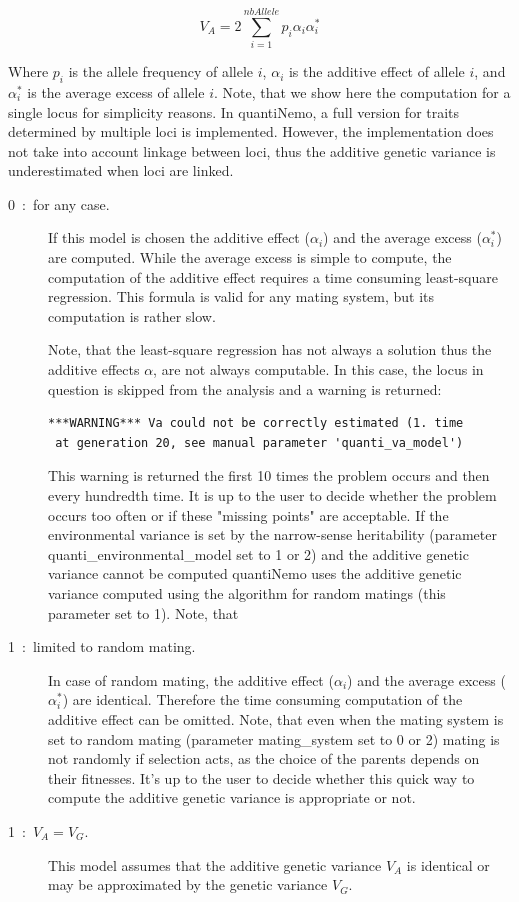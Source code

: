 \documentclass[letterpaper,12pt,oneside]{book}
\begin{document}
\begin{description}
\[ V_{A} = 2\sum_{i=1}^{nbAllele}p_{i}\alpha_{i}\alpha_{i}^{*} \]

Where $p_{i}$ is the allele frequency of allele $i$, $\alpha_{i}$ is the additive effect of allele $i$, and $\alpha_{i}^{*}$ is the average excess of allele $i$. Note, that we show here the computation for a single locus for simplicity reasons. In quantiNemo, a full version for traits determined by multiple loci is implemented. However, the implementation does not take into account linkage between loci, thus the additive genetic variance is underestimated when loci are linked.

\begin{description}
\item [0~:~for any case.] If this model is chosen the additive effect ($\alpha_{i}$) and the average excess ($\alpha_{i}^{*}$) are computed. While the average excess is simple to compute, the computation of the additive effect requires a time consuming least-square regression. This formula is valid for any mating system, but its computation is rather slow. 

Note, that the least-square regression has not always a solution thus the additive effects $\alpha$, are not always computable. In this case, the locus in question is skipped from the analysis and a warning is returned:
\begin{lstlisting}[frame=single]
***WARNING*** Va could not be correctly estimated (1. time
 at generation 20, see manual parameter 'quanti_va_model')
\end{lstlisting}

This warning is returned the first 10 times the problem occurs and then every hundredth time. It is up to the user to decide whether the problem occurs too often or if these "missing points" are acceptable. If the environmental variance is set by the narrow-sense heritability (parameter \textsf{quanti\_environmental\_model} set to 1 or 2) and the additive genetic variance cannot be computed quantiNemo uses the additive genetic variance computed using the algorithm for random matings (this parameter set to 1). Note, that  

 
\item [1~:~limited to random mating.] In case of random mating, the additive effect ($\alpha_{i}$) and the average excess ($\alpha_{i}^{*}$) are identical. Therefore the time consuming computation of the additive effect can be omitted. Note, that even when the mating system is set to random mating (parameter \textsf{mating\_system} set to 0 or 2) mating is not randomly if selection acts, as the choice of the parents depends on their fitnesses. It's up to the user to decide whether this quick way to compute the additive genetic variance is appropriate or not.  

\item [1~:~$V_{A} = V_{G}$.] This model assumes that the additive genetic variance $V_{A}$ is identical or may be approximated by the genetic variance $V_{G}$. 
\end{description}
\end{description}
\end{document}

